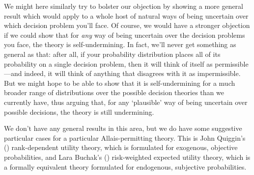 \documentclass[a4paper,final]{article}
\newcommand{\todoold}[2][]{\todo[backgroundcolor=white,bordercolor=orange!10,linecolor=gray!10, #1,caption={},textcolor=gray]{Pre-rev: #2}}
\renewcommand{\color}[1]{}
\newenvironment{CCM rewritten}
{\begingroup\color{blue}} %
{\endgroup}              %
\begin{document}
We might here similarly try to bolster our objection by showing a more general result which would apply to a whole host of natural ways of being uncertain over which decision problem you'll face. 
Of course, we would have a stronger objection if we could show that for \emph{any} way of being uncertain over the decision problems you face, the theory is self-undermining. In fact, we'll never get something as general as that: after all, if your probability distribution places all of its probability on a single decision problem, then it will think of itself as permissible---and indeed, it will think of anything that disagrees with it as impermissible. But we might hope to be able to show that it is self-undermining for a much broader range of distributions over the possible decision theories than we currently have, thus arguing that, for any `plausible' way of being uncertain over possible decisions, the theory is still undermining. 


We don't have any general results in this area, but we do have some suggestive particular cases for a particular Allais-permitting theory. This is John Quiggin's (\citeyear{quiggin1982tau,quiggin1993geut}) rank-dependent utility theory, which is formulated for exogenous, objective probabilities, and Lara Buchak's (\citeyear{buchak2014rr}) risk-weighted expected utility theory, which is a formally equivalent theory formulated for endogenous, subjective probabilities.
\end{document}
